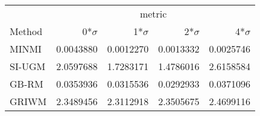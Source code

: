 
\begin{tabular}{lrrrr}
\toprule
\multicolumn{1}{c}{ } & \multicolumn{4}{c}{metric} \\
\cmidrule(l{3pt}r{3pt}){2-5}
Method & 0*$\sigma$ & 1*$\sigma$ & 2*$\sigma$ & 4*$\sigma$\\
\midrule
MINMI & 0.0043880 & 0.0012270 & 0.0013332 & 0.0025746\\
SI-UGM & 2.0597688 & 1.7283171 & 1.4786016 & 2.6158584\\
GB-RM & 0.0353936 & 0.0315536 & 0.0292933 & 0.0371096\\
GRIWM & 2.3489456 & 2.3112918 & 2.3505675 & 2.4699116\\
\bottomrule
\end{tabular}
